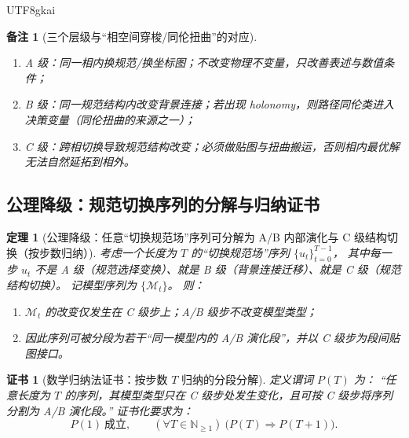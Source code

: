 \documentclass[12pt]{article}
\newtheorem{theorem}{定理}[section]
\newtheorem{remark}{备注}[section]
\newtheorem{Certificate}{证书}[section]
\newcommand{\NN}{\mathbb{N}}
\begin{document}
\begin{CJK*}{UTF8}{gkai}
\begin{remark}[三个层级与“相空间穿梭/同伦扭曲”的对应]
\begin{enumerate}
  \item A 级：同一相内换规范/换坐标图；不改变物理不变量，只改善表述与数值条件；
  \item B 级：同一规范结构内改变背景连接；若出现 holonomy，则路径同伦类进入决策变量（同伦扭曲的来源之一）；
  \item C 级：跨相切换导致规范结构改变；必须做贴图与扭曲搬运，否则相内最优解无法自然延拓到相外。
\end{enumerate}
\end{remark}

\subsection{公理降级：规范切换序列的分解与归纳证书}
\label{sec:gauge-switching-decomposition}

\begin{theorem}[公理降级：任意“切换规范场”序列可分解为 A/B 内部演化与 C 级结构切换（按步数归纳）]
\label{thm:gauge-switching-sequence-decomposition}
考虑一个长度为 $T$ 的“切换规范场”序列 $\{u_t\}_{t=0}^{T-1}$，
其中每一步 $u_t$ 不是 A 级（规范选择变换）、就是 B 级（背景连接迁移）、就是 C 级（规范结构切换）。
记模型序列为 $\{\mathcal{M}_t\}$。
则：
\begin{enumerate}
  \item $\mathcal{M}_t$ 的改变仅发生在 C 级步上；A/B 级步不改变模型类型；
  \item 因此序列可被分段为若干“同一模型内的 A/B 演化段”，并以 C 级步为段间贴图接口。
\end{enumerate}
\end{theorem}

\begin{Certificate}[数学归纳法证书：按步数 $T$ 归纳的分段分解]
\label{cert:gauge-switching-sequence-decomposition}
定义谓词 $P(T)$ 为：
“任意长度为 $T$ 的序列，其模型类型只在 C 级步处发生变化，且可按 C 级步将序列分割为 A/B 演化段。”
证书化要求为：
\[
  P(1)\ \text{成立},\qquad
  (\forall T\in\NN_{\ge 1})\ \bigl(P(T)\Rightarrow P(T+1)\bigr).
\]
\end{Certificate}


\end{CJK*}
\end{document}
